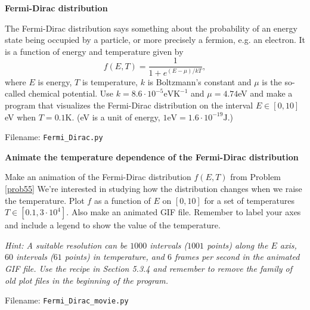 \begin{Problem}{\textbf{Fermi-Dirac distribution}} \label{prob55}

\noindent The Fermi-Dirac distribution says something about the probability of an energy
state being occupied by a particle, or more precisely a fermion, e.g. an electron.
It is a function of energy and temperature given by
\begin{equation}
f(E, T) = \frac{1}{1 + e^{(E - \mu)/kT}},
\end{equation}
where $E$ is energy, $T$ is temperature, $k$ is Boltzmann's constant and $\mu$ is
the so-called chemical potential. Use $k = 8.6 \cdot 10^{-5}\mathrm{eVK^{-1}}$ and
$\mu = 4.74$eV and make a program that visualizes the Fermi-Dirac distribution on
the interval $E \in [0, 10]$eV when $T = 0.1$K. (eV is a unit of energy, $1\mathrm{eV}
= 1.6\cdot 10^{-19}\mathrm{J}$.)

Filename: \texttt{Fermi\_Dirac.py}
\end{Problem}

\begin{Problem}{\textbf{Animate the temperature dependence of the Fermi-Dirac distribution}}

\noindent Make an animation of the Fermi-Dirac distribution $f(E, T)$ from Problem \ref{prob55}
We're interested in studying how the distribution changes when we raise the temperature.
Plot $f$ as a function of $E$ on $[0, 10]$ for a set of temperatures
$T \in [0.1, 3 \cdot 10^{4}]$. Also make an animated GIF file. Remember
to label your axes and include a legend to show the value of the temperature.

\emph{Hint: A suitable resolution can be $1 000$ intervals ($1 001$ points) along
the $E$ axis,  $60$ intervals ($61$ points) in temperature, and $6$ frames per
second in the animated GIF file. Use the recipe in Section 5.3.4 and remember to
remove the family of old plot files in the beginning of the program.}

Filename: \texttt{Fermi\_Dirac\_movie.py}
\end{Problem}

